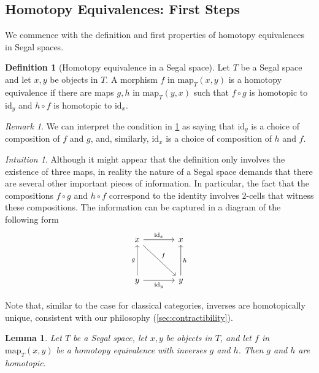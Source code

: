 \documentclass[11pt, a4paper]{amsart}
\newcommand{\map}{\mathrm{map}}
\newcommand{\id}{\mathrm{id}}
\newtheorem{lemma}[equation]{Lemma}
\theoremstyle{definition}
\newtheorem{definition}[equation]{Definition}
\theoremstyle{remark}
\newtheorem{remark}[equation]{Remark}
\newtheorem{intuition}[equation]{Intuition}
\numberwithin{equation}{section}
\begin{document}
\subsection{Homotopy Equivalences: First Steps}
We commence with the definition and first properties of homotopy equivalences in Segal spaces.

\begin{definition}[Homotopy equivalence in a Segal space] \label{def:homotopy equivalence}
  Let $T$ be a Segal space and let $x,y$ be objects in $T$. A morphism $f$ in $\map_{T}(x,y)$ is a homotopy equivalence if there are maps $g,h$ in $\map_{T}(y,x)$ such that $f \circ g$ is homotopic to $\id_y$ and $h \circ f$ is homotopic to $\id_x$.
\end{definition}
 
\begin{remark}
 We can interpret the condition in \cref{def:homotopy equivalence} as saying that $\id_y$ is a choice of composition of $f$ and $g$, and, similarly, $\id_x$ is a choice of composition of $h$ and $f$. 
\end{remark}

\begin{intuition} \label{int:homotopy equiv in ss}
  Although it might appear that the definition only involves the existence of three maps, in reality the nature of a  Segal space demands that there are several other important pieces of information. In particular, the fact that the compositions $f \circ g$ and $h \circ f$ correspond to the identity involves $2$-cells that witness these compositions. The information can be captured in a diagram of the following form 
  \[
   \begin{tikzcd}[row sep =0.5in, column sep=0.5in]
    x  \arrow[r, "\id_x"] \arrow[dr, "f"] & x \\
    y \arrow[u, "g"] \arrow[r, "\id_y"'] & y \arrow[u, "h"'] 
   \end{tikzcd}
  \]
\end{intuition}

Note that, similar to the case for classical categories, inverses are homotopically unique, consistent with our philosophy (\cref{sec:contractibility}).

\begin{lemma} \label{lemma:inverses homotopic}
 Let $T$ be a Segal space, let $x,y$ be objects in $T$, and let $f$ in $\map_{T}(x,y)$ be a homotopy equivalence with inverses $g$ and $h$. Then $g$ and $h$ are homotopic.
\end{lemma}
\end{document}
